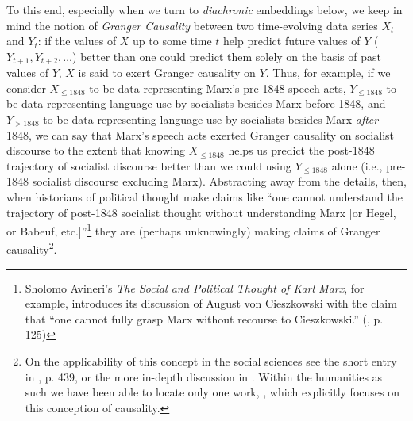 \documentclass[11pt]{article}
\begin{document}
To this end, especially when we turn to \textit{diachronic} embeddings below, we keep in mind the notion of \textit{Granger Causality} between two time-evolving data series $X_t$ and $Y_t$: if the values of $X$ up to some time $t$ help predict future values of $Y$ ($Y_{t+1}, Y_{t+2}, \ldots$) better than one could predict them solely on the basis of past values of $Y$, $X$ is said to exert Granger causality on $Y$. Thus, for example, if we consider $X_{\leq 1848}$ to be data representing Marx's pre-1848 speech acts, $Y_{\leq 1848}$ to be data representing language use by socialists besides Marx before 1848, and $Y_{> 1848}$ to be data representing language use by socialists besides Marx \textit{after} 1848, we can say that Marx's speech acts exerted Granger causality on socialist discourse to the extent that knowing $X_{\leq 1848}$ helps us predict the post-1848 trajectory of socialist discourse better than we could using $Y_{\leq 1848}$ alone (i.e., pre-1848 socialist discourse excluding Marx). Abstracting away from the details, then, when historians of political thought make claims like ``one cannot understand the trajectory of post-1848 socialist thought without understanding Marx [or Hegel, or Babeuf, etc.]''\footnote{Sholomo Avineri's \textit{The Social and Political Thought of Karl Marx}, for example, introduces its discussion of August von Cieszkowski with the claim that ``one cannot fully grasp Marx without recourse to Cieszkowski.'' (\cite{avineri_social_1968}, p. 125)} they are (perhaps unknowingly) making claims of Granger causality\footnote{On the applicability of this concept in the social sciences see the short entry in \cite{lewis-beck_sage_2003}, p. 439, or the more in-depth discussion in \cite{hlavackova-schindler_assumption_2012}. Within the humanities as such we have been able to locate only one work, \cite{wevers_tracking_2020}, which explicitly focuses on this conception of causality.}.
\end{document}
